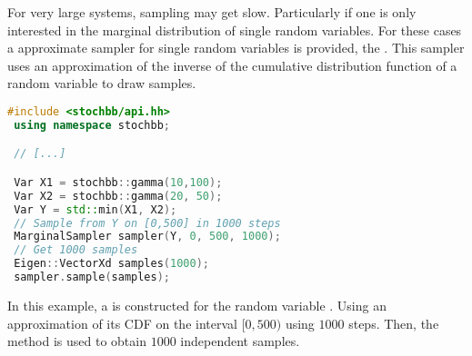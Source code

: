 For very large systems, sampling may get slow. Particularly if one is only interested
in the marginal distribution of single random variables. For these cases a approximate sampler
for single random variables is provided, the . This sampler uses an
approximation of the inverse of the cumulative distribution function of a random variable
to draw samples.
\begin{lstlisting}[language=C++]
 #include <stochbb/api.hh>
 using namespace stochbb;

 // [...]

 Var X1 = stochbb::gamma(10,100);
 Var X2 = stochbb::gamma(20, 50);
 Var Y = std::min(X1, X2);
 // Sample from Y on [0,500] in 1000 steps
 MarginalSampler sampler(Y, 0, 500, 1000);
 // Get 1000 samples
 Eigen::VectorXd samples(1000);
 sampler.sample(samples);
\end{lstlisting}

In this example, a  is constructed for the random variable . Using an
approximation of its CDF on the interval $[0,500)$ using $1000$ steps. Then, the
 method is used to obtain $1000$ independent samples.


